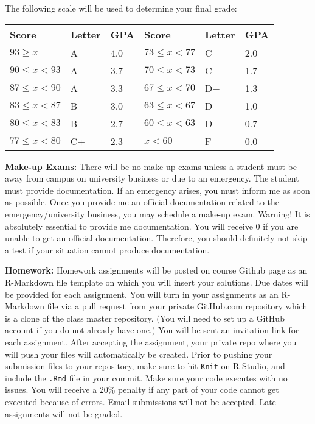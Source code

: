 \documentclass[11pt,letter]{article}
\begin{document}
The following scale will be used to determine your final grade:

\begin{center}
\begin{tabular}{lll@{\hskip .5in}lll}
\textbf{Score} & \textbf{Letter} & \textbf{GPA} & \textbf{Score} & \textbf{Letter} & \textbf{GPA}\\
\hline
$93 \geq x$	&	A	&	4.0 &  $73 \leq x < 77$	&	C	&	2.0\\
$90 \leq x < 93$	&	A-	&	3.7 & $70 \leq x < 73$	&	C-	&	1.7\\
$87 \leq x < 90$	&	A-	&	3.3 & $67 \leq x < 70$	&	D+	&	1.3\\
$83 \leq x < 87$	&	B+	&	3.0 & $63 \leq x < 67$	&	D	&	1.0\\
$80 \leq x < 83$	&	B	&	2.7 & $60 \leq x < 63$	&	D-	&	0.7\\
$77 \leq x < 80$	&	C+	&	2.3 & $x < 60$	&	F	&	0.0\\

\end{tabular}
\end{center}

\textbf{Make-up Exams:} There will be no make-up exams unless a student must be away from campus on university business or due to an emergency. The student must provide documentation. If an emergency arises, you must inform me as soon as possible. Once you provide me an official documentation related to the emergency/university business, you may schedule a make-up exam. Warning! It is absolutely essential to provide me documentation. You will receive 0 if you are unable to get an official documentation. Therefore, you should definitely not skip a test if your situation cannot produce documentation.

\textbf{Homework:} Homework assignments will be posted on course Github page as an R-Markdown file template on which you will insert your solutions. Due dates will be provided for each assignment. You will turn in your assignments as an R-Markdown file via a pull request from your private GitHub.com repository which is a clone of the class master repository. (You will need to set up a GitHub account if you do not already have one.) You will be sent an invitation link for each assignment. After accepting the assignment, your private repo where you will push your files will automatically be created. Prior to pushing your submission files to your repository, make sure to hit \texttt{Knit} on R-Studio, and include the \texttt{.Rmd} file in your commit. Make sure your code executes with no issues. You will receive a 20\% penalty if any part of your code cannot get executed because of errors. \underline{Email submissions will not be accepted.} Late assignments will not be graded.
\end{document}
